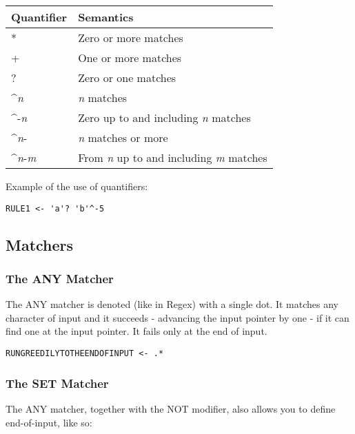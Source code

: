 \begin{center}
\label{tab:naig_quantifiers}
\begin{longtable}{ll}
\textbf{Quantifier} & \textbf{Semantics} \\
\endhead
* & Zero or more matches \\
+ & One or more matches \\
? & Zero or one matches \\
\^{}\textit{n} & \textit{n} matches \\
\^{}-\textit{n} & Zero up to and including \textit{n} matches \\
\^{}\textit{n}- & \textit{n} matches or more \\
\^{}\textit{n}-\textit{m} & From \textit{n} up to and including \textit{m} matches \\
\end{longtable}
\end{center}
 
Example of the use of quantifiers:
\begin{myquote}
\begin{verbatim}
RULE1 <- 'a'? 'b'^-5
\end{verbatim}
\end{myquote}

\subsection{Matchers}

\subsubsection{The ANY Matcher}

The ANY matcher is denoted (like in Regex) with a single dot.
It matches any character of input and it succeeds - advancing the input
pointer by one - if it can find one at the input pointer. It fails only
at the end of input.

\begin{myquote}
\begin{verbatim}
RUNGREEDILYTOTHEENDOFINPUT <- .*
\end{verbatim}
\end{myquote}

\subsubsection{The SET Matcher}

The ANY matcher, together with the NOT modifier,
also allows you to define end-of-input, like so:

